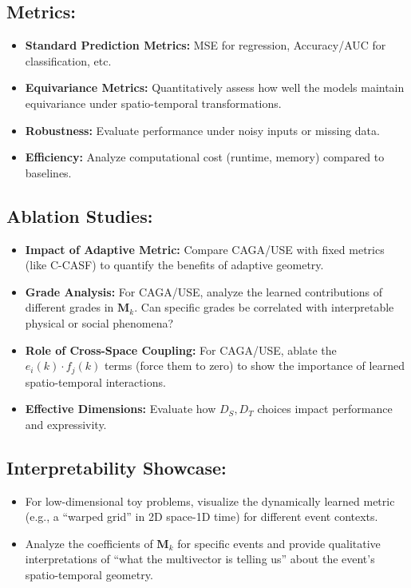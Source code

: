 \documentclass[11pt]{article}
\newcommand{\Ds}{D_S} %
\newcommand{\Dt}{D_T} %
\newcommand{\Mvec}{\mathbf{M}} %
\begin{document}
\subsection{Metrics:}
\begin{itemize}[noitemsep]
    \item \textbf{Standard Prediction Metrics:} MSE for regression, Accuracy/AUC for classification, etc.
    \item \textbf{Equivariance Metrics:} Quantitatively assess how well the models maintain equivariance under spatio-temporal transformations.
    \item \textbf{Robustness:} Evaluate performance under noisy inputs or missing data.
    \item \textbf{Efficiency:} Analyze computational cost (runtime, memory) compared to baselines.
\end{itemize}

\subsection{Ablation Studies:}
\begin{itemize}[noitemsep]
    \item \textbf{Impact of Adaptive Metric:} Compare CAGA/USE with fixed metrics (like C-CASF) to quantify the benefits of adaptive geometry.
    \item \textbf{Grade Analysis:} For CAGA/USE, analyze the learned contributions of different grades in $\Mvec_k$. Can specific grades be correlated with interpretable physical or social phenomena?
    \item \textbf{Role of Cross-Space Coupling:} For CAGA/USE, ablate the $e_i(k) \cdot f_j(k)$ terms (force them to zero) to show the importance of learned spatio-temporal interactions.
    \item \textbf{Effective Dimensions:} Evaluate how $\Ds, \Dt$ choices impact performance and expressivity.
\end{itemize}

\subsection{Interpretability Showcase:}
\begin{itemize}[noitemsep]
    \item For low-dimensional toy problems, visualize the dynamically learned metric (e.g., a ``warped grid'' in 2D space-1D time) for different event contexts.
    \item Analyze the coefficients of $\Mvec_k$ for specific events and provide qualitative interpretations of ``what the multivector is telling us'' about the event's spatio-temporal geometry.
\end{itemize}
\end{document}
